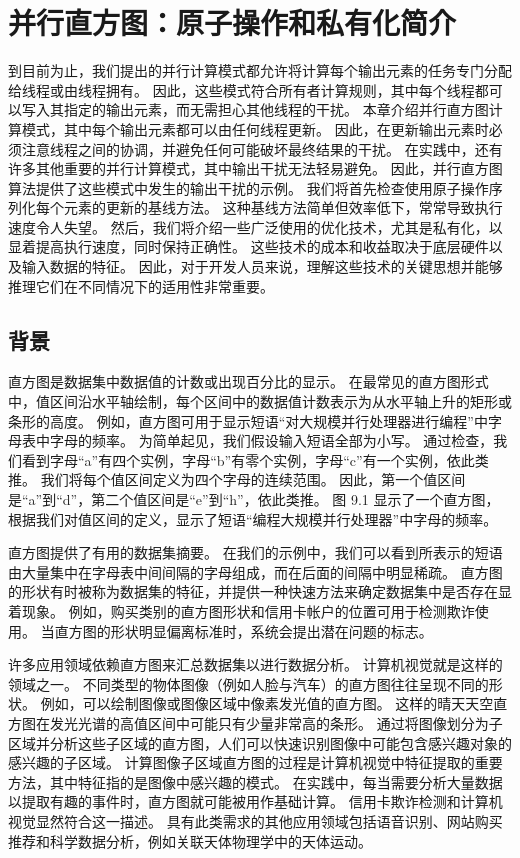 \section{并行直方图：原子操作和私有化简介}
到目前为止，我们提出的并行计算模式都允许将计算每个输出元素的任务专门分配给线程或由线程拥有。 因此，这些模式符合所有者计算规则，其中每个线程都可以写入其指定的输出元素，而无需担心其他线程的干扰。 本章介绍并行直方图计算模式，其中每个输出元素都可以由任何线程更新。 因此，在更新输出元素时必须注意线程之间的协调，并避免任何可能破坏最终结果的干扰。 在实践中，还有许多其他重要的并行计算模式，其中输出干扰无法轻易避免。 因此，并行直方图算法提供了这些模式中发生的输出干扰的示例。 我们将首先检查使用原子操作序列化每个元素的更新的基线方法。 这种基线方法简单但效率低下，常常导致执行速度令人失望。 然后，我们将介绍一些广泛使用的优化技术，尤其是私有化，以显着提高执行速度，同时保持正确性。 这些技术的成本和收益取决于底层硬件以及输入数据的特征。 因此，对于开发人员来说，理解这些技术的关键思想并能够推理它们在不同情况下的适用性非常重要。

\subsection{背景}
直方图是数据集中数据值的计数或出现百分比的显示。 在最常见的直方图形式中，值区间沿水平轴绘制，每个区间中的数据值计数表示为从水平轴上升的矩形或条形的高度。 例如，直方图可用于显示短语“对大规模并行处理器进行编程”中字母表中字母的频率。 为简单起见，我们假设输入短语全部为小写。 通过检查，我们看到字母“a”有四个实例，字母“b”有零个实例，字母“c”有一个实例，依此类推。 我们将每个值区间定义为四个字母的连续范围。 因此，第一个值区间是“a”到“d”，第二个值区间是“e”到“h”，依此类推。 图 9.1 显示了一个直方图，根据我们对值区间的定义，显示了短语“编程大规模并行处理器”中字母的频率。

直方图提供了有用的数据集摘要。 在我们的示例中，我们可以看到所表示的短语由大量集中在字母表中间间隔的字母组成，而在后面的间隔中明显稀疏。 直方图的形状有时被称为数据集的特征，并提供一种快速方法来确定数据集中是否存在显着现象。 例如，购买类别的直方图形状和信用卡帐户的位置可用于检测欺诈使用。 当直方图的形状明显偏离标准时，系统会提出潜在问题的标志。

许多应用领域依赖直方图来汇总数据集以进行数据分析。 计算机视觉就是这样的领域之一。 不同类型的物体图像（例如人脸与汽车）的直方图往往呈现不同的形状。 例如，可以绘制图像或图像区域中像素发光值的直方图。 这样的晴天天空直方图在发光光谱的高值区间中可能只有少量非常高的条形。 通过将图像划分为子区域并分析这些子区域的直方图，人们可以快速识别图像中可能包含感兴趣对象的感兴趣的子区域。 计算图像子区域直方图的过程是计算机视觉中特征提取的重要方法，其中特征指的是图像中感兴趣的模式。 在实践中，每当需要分析大量数据以提取有趣的事件时，直方图就可能被用作基础计算。 信用卡欺诈检测和计算机视觉显然符合这一描述。 具有此类需求的其他应用领域包括语音识别、网站购买推荐和科学数据分析，例如关联天体物理学中的天体运动。

